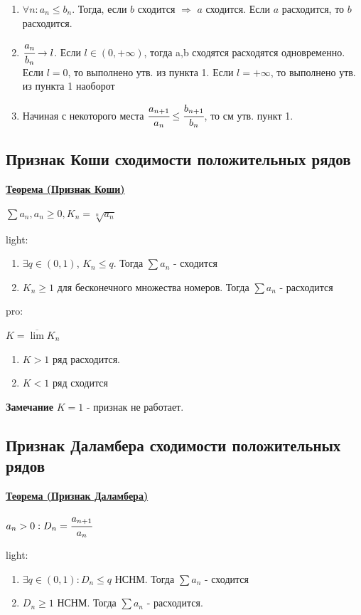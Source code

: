 \documentclass{article}
\newcommand{\thmm}[1]{\underline{\textbf{#1}}}
\begin{document}
\begin{enumerate}
    \item  $\forall n: a_n \leq b_n$. Тогда, если $b$ сходится $\Rightarrow$  $a$ сходится. Если $a$ расходится, то $b$ расходится.
    \item $\cfrac{a_n}{b_n}\rightarrow l$. Если $ l \in (0,+\infty)$, тогда a,b сходятся расходятся одновременно. Если $l = 0$, то выполнено утв. из пункта 1. Если $l=+\infty$, то выполнено утв. из пункта 1 наоборот
    \item Начиная с некоторого места $\cfrac{a_{n+1}}{a_n}\leq \cfrac{b_{n+1}}{b_n}$, то см утв. пункт 1.
\end{enumerate}

\subsection{Признак Коши сходимости положительных рядов}

\thmm{Теорема (Признак Коши)}

$\sum a_n, a_n \geq 0 , K_n = \sqrt[n]{a_n}$

light:
\begin{enumerate}
    \item $\exists q \in (0,1)$, $K_n \leq q$. Тогда $\sum a_n$ - сходится
    \item $K_{n}\geq 1$ для бесконечного множества номеров. Тогда $\sum a_n$ - расходится
\end{enumerate}
pro:

$K = \overline{\lim} K_n$
\begin{enumerate}
    \item $K>1$ ряд расходится.
    \item $K<1$ ряд сходится
\end{enumerate}

\textbf{Замечание} $K=1$ - признак не работает.

\subsection{Признак Даламбера сходимости положительных рядов}

\thmm{Теорема (Признак Даламбера)}

$a_n > 0: D_n = \cfrac{a_{n+1}}{a_n}$

light: 
\begin{enumerate}
    \item $\exists q \in (0,1): D_n \leq q$ НСНМ. Тогда $\sum a_n$ - сходится
    \item $D_n \geq 1$ НСНМ. Тогда $\sum a_n$ - расходится.
\end{enumerate}
\end{document}
